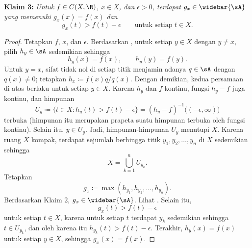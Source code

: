 \noindent
\textbf{Klaim 3:} \emph{Untuk $f \in C(X,\R)$, $x \in X$, dan $\epsilon > 0$,
terdapat $g_x \in \widebar{\sA}$ yang memenuhi $g_x(x) = f(x)$ dan
}
\begin{equation*}
g_x(t) > f(t)-\epsilon \qquad \text{untuk setiap } t \in X.
\end{equation*}

\begin{proof}
Tetapkan $f$, $x$, dan $\epsilon$.
Berdasarkan , untuk setiap $y \in X$ dengan
$y \neq x$, pilih $h_y \in
\sA$ sedemikian sehingga
\begin{equation*}
h_y(x) = f(x), \qquad h_y(y)=f(y) .
\end{equation*}
Untuk $y=x$, sifat tidak nol di setiap titik menjamin adanya $q \in \sA$
dengan $q(x) \neq 0$; tetapkan $h_x \coloneqq f(x)q/q(x)$. Dengan demikian,
kedua persamaan di atas berlaku untuk setiap $y \in X$.
Karena $h_y$ dan $f$ kontinu, fungsi $h_y-f$ juga kontinu,
dan himpunan
\begin{equation*}
U_y \coloneqq
\bigl\{ t \in X : h_y(t) > f(t) -\epsilon \bigr\}
=
{(h_y-f)}^{-1} \bigl( (-\epsilon,\infty) \bigr)
\end{equation*}
terbuka (himpunan itu merupakan prapeta suatu himpunan terbuka oleh fungsi
kontinu). Selain itu, $y \in U_y$. Jadi, himpunan-himpunan $U_y$ menutupi
$X$. Karena ruang $X$ kompak, terdapat sejumlah berhingga titik
$y_1,y_2,\ldots,y_n$ di $X$ sedemikian sehingga
\begin{equation*}
X = \bigcup_{k=1}^n U_{y_k}  .
\end{equation*}
Tetapkan
\begin{equation*}
g_x \coloneqq \max(h_{y_1},h_{y_2},\ldots,h_{y_n}) .
\end{equation*}
Berdasarkan Klaim 2, $g_x \in \widebar{\sA}$. Lihat .
Selain itu,
\begin{equation*}
g_x(t) > f(t) -\epsilon
\end{equation*}
untuk setiap $t \in X$, karena untuk setiap $t$ terdapat $y_k$ sedemikian
sehingga $t \in U_{y_k}$, dan oleh karena itu
$h_{y_k}(t) > f(t) -\epsilon$.
Terakhir, $h_y(x) = f(x)$ untuk setiap $y \in X$, sehingga
$g_x(x) = f(x)$.
\end{proof}

